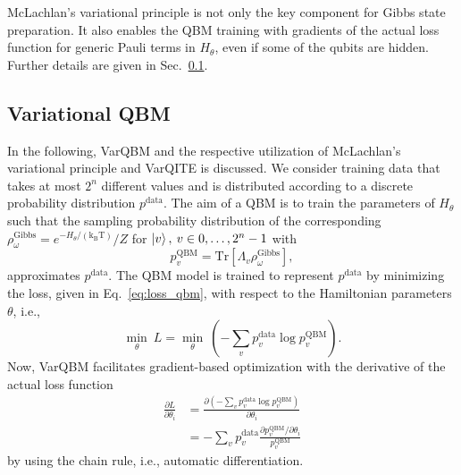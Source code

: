 \documentclass[twocolumn, aps, pra, superscriptaddress, floatfix]{revtex4}
\newcommand{\varqbm}{VarQBM}
\begin{document}
McLachlan's variational principle is not only the key component for Gibbs state preparation. It also enables the QBM training with gradients of the actual loss function for generic Pauli terms in $H_{\theta}$, even if some of the qubits are hidden. Further details are given in Sec.~\ref{sec:implementation}.

\subsection{Variational QBM}
\label{sec:implementation}

In the following, \varqbm{} and the respective utilization of McLachlan's variational principle and VarQITE is discussed.
We consider training data that takes at most $2^n$ different values and is distributed according to a discrete probability distribution $p^{\text{data}}$.
The aim of a QBM is to train the parameters of $H_{\theta}$ such that the sampling probability distribution of the corresponding $\rho_{\omega}^{\text{Gibbs}}= e^{-H_{\theta}/\left(\text{k}_{\text{B}}\text{T}\right)} / Z$ for $\ket{v}, \: v\in{0, \ldots, 2^n-1}$ with
\begin{equation*}
 p_v^{\text{QBM}} = \text{Tr}\left[\Lambda_v\rho_{\omega}^{\text{Gibbs}}\right],    
\end{equation*}
approximates $p^{\text{data}}$.
The QBM model is trained to represent $p^{\text{data}}$ by minimizing the loss, given in Eq.~\eqref{eq:loss_qbm}, with respect to the Hamiltonian parameters $\theta$, i.e.,
\begin{equation*}
    \underset{\theta}{\min} \: L = \underset{\theta}{\min} \: \left(-\sum\limits_{v}p_v^{\text{data}}\log{p_v^{\text{QBM}}}\right).
\end{equation*}
Now, \varqbm{} facilitates gradient-based optimization with the derivative of the actual loss function
\begin{equation}
\label{eq:loss_derivative}
\begin{split}
	\frac{\partial L}{\partial\theta_i} &= \frac{\partial\left( - \sum\limits_{v}p_v^{\text{data}}\log{p_v^{\text{QBM}}}\right)}{\partial\theta_i} \\ &= - \sum\limits_{v}p_v^{\text{data}}\frac{\partial p_v^{\text{QBM}}/\partial\theta_i}{p_v^{\text{QBM}}}
		\end{split}
\end{equation}
by using the chain rule, i.e., automatic differentiation.
\end{document}
